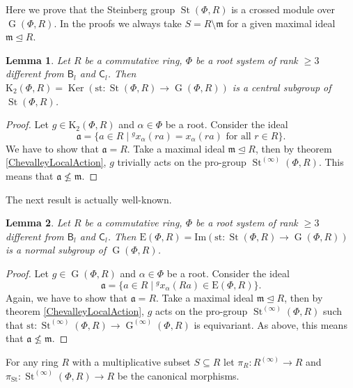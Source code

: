 \documentclass{article}
\numberwithin{equation}{section}
\newtheorem{lemma}{Lemma} \numberwithin{lemma}{section}
\theoremstyle{definition}
\theoremstyle{remark}
\DeclareMathOperator\St{St}
\DeclareMathOperator\Ker{Ker}
\DeclareMathOperator\GG{G}
\newcommand{\up}[2]{{^{#1}\!{#2}}}
\newcommand{\rB}{\mathsf{B}}
\newcommand{\rC}{\mathsf{C}}
\begin{document}
Here we prove that the Steinberg group \(\St(\Phi, R)\) is a crossed module over \(\GG(\Phi, R)\). In the proofs we always take \(S = R \setminus \mathfrak m\) for a given maximal ideal \(\mathfrak m \trianglelefteq R\).

\begin{lemma}\label{CentralityK2}
 Let \(R\) be a commutative ring, \(\Phi\) be a root system of rank \(\geq 3\) different from \(\rB_l\) and \(\rC_l\). Then \(\mathrm K_2(\Phi, R) = \Ker(\mathrm{st} \colon \St(\Phi, R) \to \GG(\Phi, R))\) is a central subgroup of \(\St(\Phi, R)\).
\end{lemma}
\begin{proof}
 Let \(g \in \mathrm K_2(\Phi, R)\) and \(\alpha \in \Phi\) be a root. Consider the ideal
 \[\mathfrak a = \{a \in R \mid \up g{x_\alpha(ra)} = x_\alpha(ra) \text{ for all } r \in R\}.\]
 We have to show that \(\mathfrak a = R\). Take a maximal ideal \(\mathfrak m \trianglelefteq R\), then by theorem \ref{ChevalleyLocalAction}, \(g\) trivially acts on the pro-group \(\St^{(\infty)}(\Phi, R)\). This means that \(\mathfrak a \not \leq \mathfrak m\).
\end{proof}

The next result is actually well-known. %

\begin{lemma}\label{Normality}
 Let \(R\) be a commutative ring, \(\Phi\) be a root system of rank \(\geq 3\) different from \(\rB_l\) and \(\rC_l\). Then \(\mathrm E(\Phi, R) = \mathrm{Im}(\mathrm{st} \colon \St(\Phi, R) \to \GG(\Phi, R))\) is a normal subgroup of \(\GG(\Phi, R)\).
\end{lemma}
\begin{proof}
 Let \(g \in \GG(\Phi, R)\) and \(\alpha \in \Phi\) be a root. Consider the ideal
 \[\mathfrak a = \{a \in R \mid \up g{x_\alpha(Ra)} \in \mathrm E(\Phi, R)\}.\]
 Again, we have to show that \(\mathfrak a = R\). Take a maximal ideal \(\mathfrak m \trianglelefteq R\), then by theorem \ref{ChevalleyLocalAction}, \(g\) acts on the pro-group \(\St^{(\infty)}(\Phi, R)\) such that \(\mathrm{st} \colon \St^{(\infty)}(\Phi, R) \to \GG^{(\infty)}(\Phi, R)\) is equivariant. As above, this means that \(\mathfrak a \not \leq \mathfrak m\).
\end{proof}

For any ring \(R\) with a multiplicative subset \(S \subseteq R\) let \(\pi_R \colon R^{(\infty)} \to R\) and \(\pi_{\St} \colon \St^{(\infty)}(\Phi, R) \to R\) be the canonical morphisms.
\end{document}
